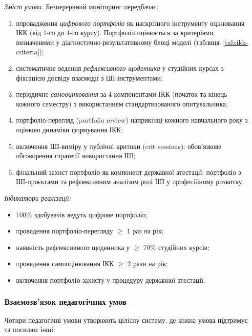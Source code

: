 \textit{Зміст умови.} Безперервний моніторинг передбачає:
\begin{enumerate}
    \item впровадження \textit{цифрового портфоліо} як наскрізного інструменту оцінювання ІКК (від 1-го до 4-го курсу). Портфоліо оцінюється за критеріями, визначеними у діагностично-результативному блоці моделі (таблиця~\ref{tab:ikk-criteria});
    \item систематичне ведення \textit{рефлексивного щоденника} у студійних курсах з фіксацією досвіду взаємодії з ШІ-інструментами;
    \item періодичне \textit{самооцінювання} за 4 компонентами ІКК (початок та кінець кожного семестру) з використанням стандартизованого опитувальника;
    \item портфоліо-перегляд (portfolio review) наприкінці кожного навчального року з оцінкою динаміки формування ІКК;
    \item включення ШІ-виміру у публічні критики (crit sessions): обов'язкове обговорення стратегії використання ШІ;
    \item фінальний захист портфоліо як компонент державної атестації: портфоліо з ШІ-проєктами та рефлексивним аналізом ролі ШІ у професійному розвитку.
\end{enumerate}

\textit{Індикатори реалізації:}
\begin{itemize}
    \item 100\% здобувачів ведуть цифрове портфоліо;
    \item проведення портфоліо-перегляду $\geq$ 1 раз на рік;
    \item наявність рефлексивного щоденника у $\geq$ 70\% студійних курсів;
    \item проведення самооцінювання ІКК $\geq$ 2 рази на рік;
    \item включення портфоліо-захисту у процедуру державної атестації.
\end{itemize}

\subsubsection{Взаємозв'язок педагогічних умов}\label{sssec:3.3.2}

Чотири педагогічні умови утворюють цілісну систему, де кожна умова підтримує та посилює інші:

